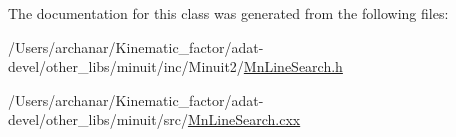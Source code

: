 The documentation for this class was generated from the following files\+:\begin{DoxyCompactItemize}
\item 
/\+Users/archanar/\+Kinematic\+\_\+factor/adat-\/devel/other\+\_\+libs/minuit/inc/\+Minuit2/\mbox{\hyperlink{adat-devel_2other__libs_2minuit_2inc_2Minuit2_2MnLineSearch_8h}{Mn\+Line\+Search.\+h}}\item 
/\+Users/archanar/\+Kinematic\+\_\+factor/adat-\/devel/other\+\_\+libs/minuit/src/\mbox{\hyperlink{adat-devel_2other__libs_2minuit_2src_2MnLineSearch_8cxx}{Mn\+Line\+Search.\+cxx}}\end{DoxyCompactItemize}
